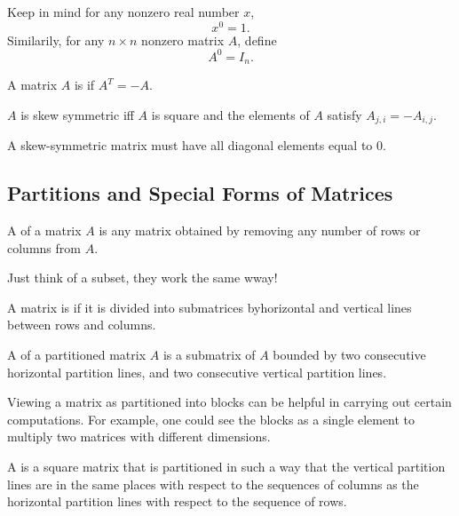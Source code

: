 \begin{remark}
  Keep in mind for any nonzero real number $x$, 
  \begin{equation*}
    x^{0} = 1.
  \end{equation*}
  Similarily, for any $n \times n$ nonzero matrix $A$, define
  \begin{equation*}
    A^{0} = I_{n}.
  \end{equation*}
\end{remark}

\begin{definition}
  A matrix $A$ is  if $A^{T} = -A$. 

  $A$ is skew symmetric iff $A$ is square and the elements of $A$ satisfy $A_{j, i} = -A_{i, j}$.
\end{definition}

\begin{corollary}
  A skew-symmetric matrix must have all diagonal elements equal to 0.
\end{corollary}

\subsection{Partitions and Special Forms of Matrices}
\begin{definition}
  A  of a matrix $A$ is any matrix obtained by removing any number of rows or columns from $A$.
\end{definition}

Just think of a subset, they work the same wway!

\begin{definition}
  A matrix is  if it is divided into submatrices byhorizontal and vertical lines between rows and columns.
\end{definition}

\begin{definition}
  A  of a partitioned matrix $A$ is a submatrix of $A$ bounded by two consecutive horizontal partition lines,
  and two consecutive vertical partition lines.
\end{definition}

Viewing a matrix as partitioned into blocks can be helpful in carrying out certain computations. 
For example, one could see the blocks as a single element to multiply two matrices with different dimensions.

\begin{definition}
  A  is a square matrix that is partitioned in such a way that the vertical 
  partition lines are in the same places with respect to the sequences of columns as the horizontal partition lines
  with respect to the sequence of rows.
\end{definition}

